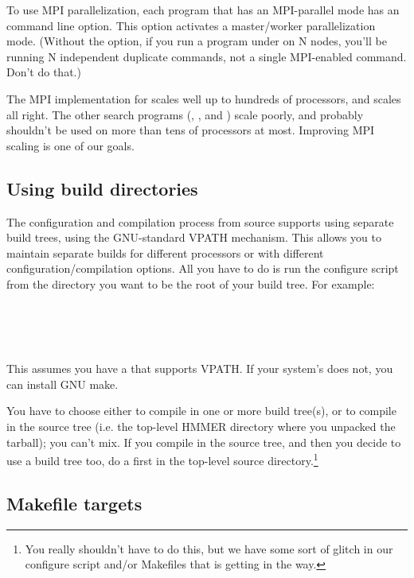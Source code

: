 To use MPI parallelization, each program that has an MPI-parallel mode
has an  command line option. This option activates a
master/worker parallelization mode. (Without the  option,
if you run a program under  on N nodes, you'll be
running N independent duplicate commands, not a single MPI-enabled
command. Don't do that.)

The MPI implementation for  scales well up to hundreds
of processors, and  scales all right. The other search
programs (, , and ) scale
poorly, and probably shouldn't be used on more than tens of processors
at most. Improving MPI scaling is one of our goals.


\subsection{Using build directories}

The configuration and compilation process from source supports using
separate build trees, using the GNU-standard VPATH mechanism. This
allows you to maintain separate builds for different processors or
with different configuration/compilation options. All you have to do
is run the configure script from the directory you want to be the root
of your build tree.  For example:

\\
\\
\\

This assumes you have a  that supports VPATH. If your
system's  does not, you can install GNU make.

You have to choose either to compile in one or more build tree(s), or
to compile in the source tree (i.e. the top-level HMMER directory
where you unpacked the tarball); you can't mix.  If you compile in the
source tree, and then you decide to use a build tree too, do a
 first in the top-level source
directory.\footnote{You really shouldn't have to do this, but we have
  some sort of glitch in our configure script and/or Makefiles that is
  getting in the way.}


\subsection{Makefile targets}

